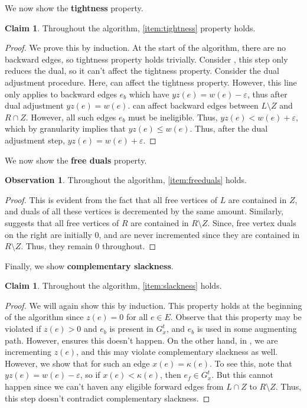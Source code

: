 \documentclass[a4paper,11pt]{article}
\newcommand{\eps}{\varepsilon}
\theoremstyle{definition}
\theoremstyle{definition}
\theoremstyle{definition}
\theoremstyle{definition}
\theoremstyle{definition}
\theoremstyle{definition}
\theoremstyle{definition}
\newtheorem{observation2}[definition2]{Observation}
\theoremstyle{definition}
\newtheorem{claim2}[definition2]{Claim}
\theoremstyle{definition}
\theoremstyle{definition}
\theoremstyle{definition}
\theoremstyle{definition}
\theoremstyle{definition}
\theoremstyle{definition}
\theoremstyle{definition}
\begin{document}
We now show the \textbf{tightness} property. 

\begin{claim2}
Throughout the algorithm, \ref{item:tightness} property holds.
\end{claim2}
\begin{proof}
    We prove this by induction. At the start of the algorithm, there are no backward edges, so tightness property holds trivially. Consider , this step only reduces the dual, so it can't affect the tightness property. Consider the dual adjustment procedure. Here,  can affect the tightness property. However, this line only applies to backward edges $e_b$ which have $yz(e)=w(e)-\eps$, thus after dual adjustment $yz(e)=w(e)$.  can affect backward edges between $L\setminus Z$ and $R\cap Z$. However, all such edges $e_b$ must be ineligible. Thus, $yz(e)<w(e)+\eps$, which by granularity implies that $yz(e)\leqslant w(e)$. Thus, after the dual adjustment step, $yz(e)=w(e)+\eps$.  
\end{proof}

We now show the \textbf{free duals} property.

\begin{observation2}
    Throughout the algorithm, \ref{item:freeduals} holds.
\end{observation2}
\begin{proof}
    This is evident from the fact that all free vertices of $L$ are contained in $Z$, and duals of all these vertices is decremented by the same amount. Similarly,  suggests that all free vertices of $R$ are contained in $R\setminus Z$. Since, free vertex duals on the right are initially $0$, and are never incremented since they are contained in $R\setminus Z$. Thus, they remain $0$ throughout. 
\end{proof}

Finally, we show \textbf{complementary slackness}.

\begin{claim2}
Throughout the algorithm, \ref{item:slackness} holds.
\end{claim2}
\begin{proof}
    We will again show this by induction. This property holds at the beginning of the algorithm since $z(e)=0$ for all $e\in E$. Observe that this property may be violated if $z(e)>0$ and $e_b$ is present in $G^t_x$, and $e_b$ is used in some augmenting path. However,  ensures this doesn't happen. On the other hand, in , we are incrementing $z(e)$, and this may violate complementary slackness as well. However, we show that for such an edge $x(e)=\kappa(e)$. To see this, note that $yz(e)=w(e)-\eps$, so if $x(e)<\kappa(e)$, then $e_f\in G^t_x$. But this cannot happen since we can't haven any eligible forward edges from $L\cap Z$ to $R\setminus Z$. Thus, this step doesn't contradict complementary slackness.
\end{proof}
\end{document}
